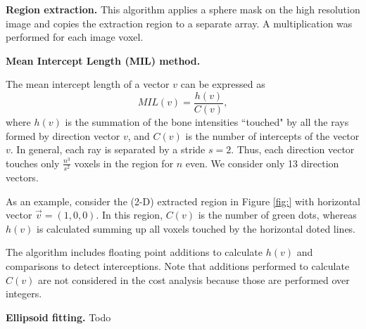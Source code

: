 \documentclass[letterpaper]{article}
\newcommand{\mypar}[1]{{\bf #1.}}
\begin{document}
\mypar{Region extraction}
This algorithm applies a sphere mask on the high resolution image and copies the extraction region to a separate array. A multiplication was performed for each image voxel.

\mypar{Mean Intercept Length (MIL) method}

The mean intercept length of a vector ${v}$ can be expressed as
\begin{equation}
  MIL({v}) = \frac{h({v})}{C({v})},
\end{equation}
where $h(v)$ is the summation of the bone intensities ``touched" by all the rays formed by direction vector $v$, and $C(v)$ is the number of intercepts of the vector $v$.  In general, each ray is separated by a stride $s=2$. Thus, each direction vector touches only $\frac{n^3}{s^2}$ voxels in the region for $n$ even. We consider only 13 direction vectors.

As an example, consider the (2-D) extracted region in Figure \ref{fig:} with horizontal vector $\vec{v} = (1,0,0)$. In this region, $C({v})$ is the number of green dots, whereas $h({v})$ is calculated summing up all voxels touched by the horizontal doted lines.


The algorithm includes floating point additions to calculate $h({v})$ and comparisons to detect interceptions. Note that additions performed to calculate $C({v})$ are not considered in the cost analysis because those are performed over integers.

\mypar{Ellipsoid fitting}  
{\color{red}Todo}

\end{document}
